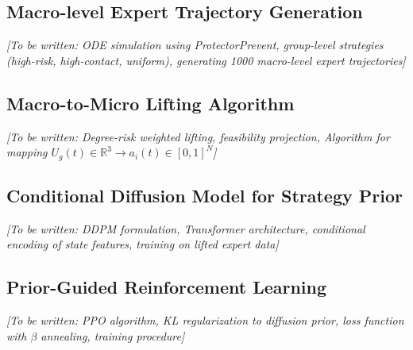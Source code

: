 \subsection{Macro-level Expert Trajectory Generation}
\label{sec:ode_expert}

\textit{[To be written: ODE simulation using ProtectorPrevent, group-level strategies (high-risk, high-contact, uniform), generating 1000 macro-level expert trajectories]}

\subsection{Macro-to-Micro Lifting Algorithm}
\label{sec:lifting}

\textit{[To be written: Degree-risk weighted lifting, feasibility projection, Algorithm for mapping $U_g(t) \in \mathbb{R}^3 \to a_i(t) \in [0,1]^N$]}

\subsection{Conditional Diffusion Model for Strategy Prior}
\label{sec:diffusion}

\textit{[To be written: DDPM formulation, Transformer architecture, conditional encoding of state features, training on lifted expert data]}

\subsection{Prior-Guided Reinforcement Learning}
\label{sec:rl}

\textit{[To be written: PPO algorithm, KL regularization to diffusion prior, loss function with $\beta$ annealing, training procedure]}

